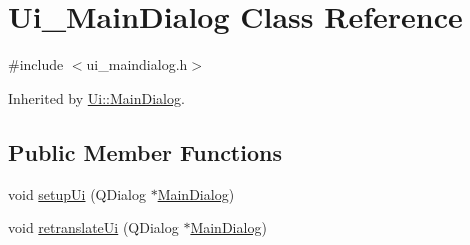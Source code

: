 \hypertarget{class_ui___main_dialog}{\section{Ui\-\_\-\-Main\-Dialog Class Reference}
\label{class_ui___main_dialog}
}


{\ttfamily \#include $<$ui\-\_\-maindialog.\-h$>$}



Inherited by \hyperlink{class_ui_1_1_main_dialog}{Ui\-::\-Main\-Dialog}.

\subsection*{Public Member Functions}
\begin{DoxyCompactItemize}
\item 
void \hyperlink{class_ui___main_dialog_a6e9b39e9493381f20acbcf58c76e928d}{setup\-Ui} (Q\-Dialog $\ast$\hyperlink{class_main_dialog}{Main\-Dialog})
\item 
void \hyperlink{class_ui___main_dialog_a47609aa38e78a1cf28fbfe3c1934aaf7}{retranslate\-Ui} (Q\-Dialog $\ast$\hyperlink{class_main_dialog}{Main\-Dialog})
\end{DoxyCompactItemize}
